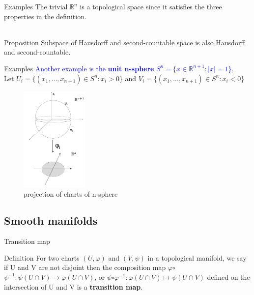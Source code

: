 \documentclass[smaller,xcolor=dvipsnames]{beamer}
\begin{document}
\begin{frame}{Examples}
The trivial $\mathbb{R}^{n}$ is a topological space since it satisfies the three properties in the definition.
\\
\pause \\
\begin{block}{Proposition}
Subspace of Hausdorff and second-countable space is also Hausdorff and second-countable.
\end{block}

\end{frame}

\begin{frame}{Examples}
\textcolor{blue}{Another example is the {\bf unit n-sphere} $S^{n}=\{x\in \mathbb{R}^{n+1}: |x| = 1\}$.} \\
\pause
Let $U_i=\{(x_1,…,x_{n+1})\in S^n:x_i>0\}$ and $V_i=\{(x_1,…,x_{n+1})\in S^n:x_i<0\}$
\begin{figure}
\centering
\includegraphics[width=33mm]{projection of charts of n-sphere.png} 
\caption{projection of charts of n-sphere}
\end{figure}
\end{frame}

\subsection{Smooth manifolds}
\begin{frame}{Transition map}
\begin{block}{Definition}
For two charts $(U,\varphi)$ and $(V,\psi)$ in a topological manifold, we say if U and V are not disjoint then the composition map $\varphi$$\circ$$\psi ^ {-1}:\psi(U\cap V)\rightarrow \varphi(U\cap V)$, or $\psi$$\circ$$\varphi ^ {-1}:\varphi(U\cap V)\mapsto \psi(U\cap V)$ defined on the intersection of U and V is a \textbf{transition map}. 
\end{block}
\end{frame}
\end{document}

